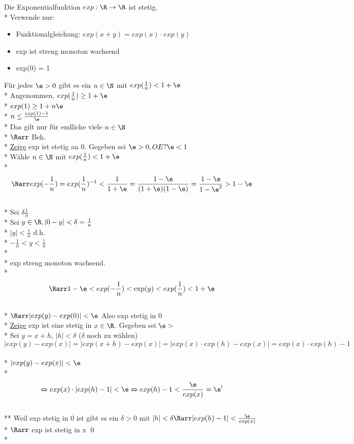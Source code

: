 Die Exponentialfunktion $exp: \R \to \R$ ist stetig.\\*
\bew
Verwende nur:
\begin{itemize}
\item{Funktionalgleichung: $exp(x + y) = exp(x) \cdot exp(y)$}
\item{exp ist streng monoton wachsend}
\item{exp(0) = 1}
\end{itemize}
Für jedes $\e > 0$ gibt es ein $n \in \N$ mit $exp(\frac{1}{n}) < 1 + \e$\\*
Angenommen, $exp(\frac{1}{n}) \geq 1 + \e$\\*
$exp(1) \geq 1 + n \e$\\*
$n \leq \frac{exp(1) - 1}{\e}$\\*
Das gilt nur für endliche viele $n \in \N$\\*
$\Rarr$ Beh.\\*
\ul{Zeige} exp ist stetig an 0. Gegeben sei $\e > 0, OE ? \e < 1$\\*
Wähle $n \in \N$ mit $exp(\frac{1}{n}) < 1 + \e$\\*
$$\Rarr exp(-\frac{1}{n}) = exp(\frac{1}{n})^{-1} < \frac{1}{1 + \e} = \frac{1 - \e}{(1+\e)(1-\e)} = \frac{1-\e}{1 - \e^2} > 1 - \e$$\\*
Sei $\delta \frac{1}{n}$\\*
Sei $y \in \R, |0 - y| < \delta = \frac{1}{n}$\\*
$|y| < \frac{1}{n}$ d.h.\\*
$-\frac{1}{n} < y < \frac{1}{n}$\\* \\*
exp streng monoton wachsend.\\*
$$\Rarr 1 - \e < exp(-\frac{1}{n}) < \exp(y) < exp(\frac{1}{n}) < 1 + \e$$\\*
$\Rarr |exp(y) - exp(0)| < \e$ Also exp stetig in 0\\*
\ul{Zeige} exp ist eine stetig in $x \in \R$. Gegeben sei $\e > $\\*
Sei $y = x + h$, $|h| < \delta$ ($\delta$ noch zu wählen)
$$|exp(y) - exp(x)| = |exp(x + h) - exp(x)| = |exp(x) \cdot exp(h) - exp(x)| = exp(x) \cdot exp(h) -1$$\\*
$|exp(y) -exp(x) | < \e$\\*
$$\Leftrightarrow exp(x) \cdot |exp(h) - 1| < \e \Leftrightarrow exp(h) - 1 < \frac{\e}{exp(x)} = \e '$$\\**
Weil exp stetig in 0 ist gibt es ein $\delta > 0$ mit $|h| < \delta \Rarr |exp(h) -1| < \frac{\e}{exp(x)}$\\*
$\Rarr$ exp ist stetig in x \qed\\*

